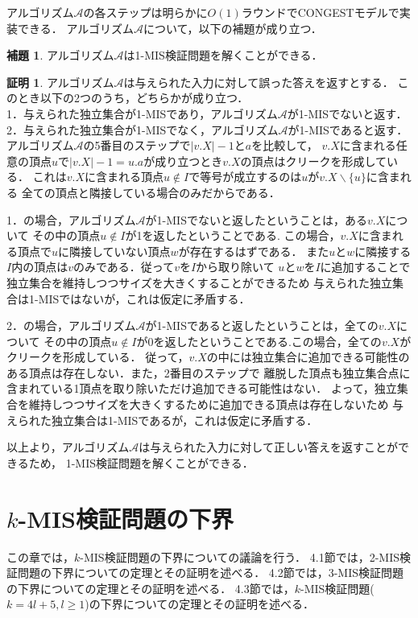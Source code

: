 \documentclass[12pt]{thesis}
\newcommand{\CONGEST}{\textsf{CONGEST}}
\theoremstyle{definition}
\newtheorem{lemma}{補題}[chapter]
\newtheorem*{prf*}{証明}
\begin{document}
アルゴリズム$\mathcal{A}$の各ステップは明らかに$O(1)$ラウンドで{\CONGEST}モデルで実装できる．
アルゴリズム$\mathcal{A}$について，以下の補題が成り立つ．
\begin{lemma}
アルゴリズム$\mathcal{A}$は1-MIS検証問題を解くことができる．
\end{lemma}
\begin{prf*}
アルゴリズム$\mathcal{A}$は与えられた入力に対して誤った答えを返すとする．
このとき以下の2つのうち，どちらかが成り立つ． \\
1．与えられた独立集合が1-MISであり，アルゴリズム$\mathcal{A}$が1-MISでないと返す． \\
2．与えられた独立集合が1-MISでなく，アルゴリズム$\mathcal{A}$が1-MISであると返す． \\

アルゴリズム$\mathcal{A}$の5番目のステップで$|v.X| - 1$と$a$を比較して，
$v.X$に含まれる任意の頂点$u$で$|v.X| - 1 = u.a$が成り立つとき$v.X$の頂点はクリークを形成している．
これは$v.X$に含まれる頂点$u \notin I$で等号が成立するのは$u$が$v.X \backslash \{u\}$に含まれる
全ての頂点と隣接している場合のみだからである．

1．の場合，アルゴリズム$\mathcal{A}$が1-MISでないと返したということは，ある$v.X$について
その中の頂点$u \notin I$が1を返したということである.
この場合，$v.X$に含まれる頂点で$u$に隣接していない頂点$w$が存在するはずである．
また$u$と$w$に隣接する$I$内の頂点は$v$のみである．従って$v$を$I$から取り除いて
$u$と$w$を$I$に追加することで独立集合を維持しつつサイズを大きくすることができるため
与えられた独立集合は1-MISではないが，これは仮定に矛盾する． 

2．の場合，アルゴリズム$\mathcal{A}$が1-MISであると返したということは，全ての$v.X$について
その中の頂点$u \notin I$が0を返したということである.この場合，全ての$v.X$がクリークを形成している．
従って，$v.X$の中には独立集合に追加できる可能性のある頂点は存在しない．また，2番目のステップで
離脱した頂点も独立集合点に含まれている1頂点を取り除いただけ追加できる可能性はない．
よって，独立集合を維持しつつサイズを大きくするために追加できる頂点は存在しないため
与えられた独立集合は1-MISであるが，これは仮定に矛盾する． 

以上より，アルゴリズム$\mathcal{A}$は与えられた入力に対して正しい答えを返すことができるため，
1-MIS検証問題を解くことができる．
\end{prf*}
\newpage

\chapter{$k$-MIS検証問題の下界}
この章では，$k$-MIS検証問題の下界についての議論を行う．
4.1節では，2-MIS検証問題の下界についての定理とその証明を述べる．
4.2節では，3-MIS検証問題の下界についての定理とその証明を述べる．
4.3節では，$k$-MIS検証問題($k = 4l + 5, l \geq 1$)の下界についての定理とその証明を述べる．
\end{document}
